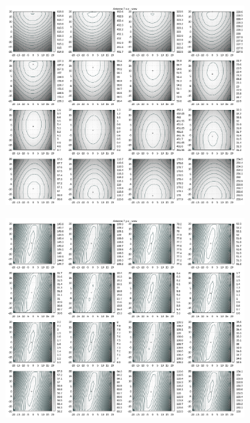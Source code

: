 \begin{appendix}
\begin{figure}[!ht]
\begin{subfigure}[t]{0.3\textwidth}
	\end{subfigure}
	\begin{subfigure}[t]{0.3\textwidth}
		\centering
	     \includegraphics[width=\textwidth]{img/fitness/xz/a7.png}
	\end{subfigure}
	\begin{subfigure}[t]{0.3\textwidth}
			\centering
	   \includegraphics[width=\textwidth]{img/fitness/yz/a7.png}
	\end{subfigure}      
\end{figure}
\newpage
%

\end{appendix}
